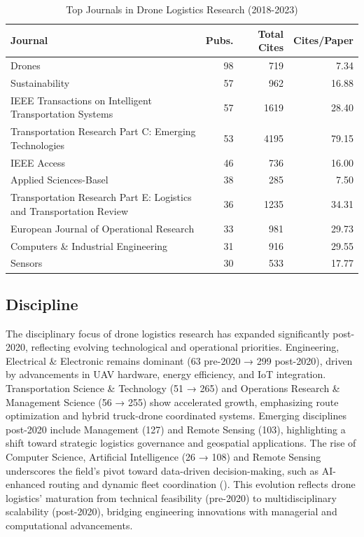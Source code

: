 \documentclass{article}
\begin{document}
\begin{table}[htbp]
  \centering
  \caption{Top Journals in Drone Logistics Research (2018-2023)}
  \label{tab:journals}
  \begin{tabularx}{0.9\textwidth}{@{} >{\raggedright}X r r r @{}}
    \toprule
    \textbf{Journal} & \textbf{Pubs.} & \textbf{Total Cites} & \textbf{Cites/Paper} \\
    \midrule
    Drones & 98 & 719 & 7.34 \\
    Sustainability & 57 & 962 & 16.88 \\
    IEEE Transactions on Intelligent Transportation Systems & 57 & 1619 & 28.40 \\
    Transportation Research Part C: Emerging Technologies & 53 & 4195 & 79.15 \\
    IEEE Access & 46 & 736 & 16.00 \\
    Applied Sciences-Basel & 38 & 285 & 7.50 \\
    Transportation Research Part E: Logistics and Transportation Review & 36 & 1235 & 34.31 \\
    European Journal of Operational Research & 33 & 981 & 29.73 \\
    Computers \& Industrial Engineering & 31 & 916 & 29.55 \\
    Sensors & 30 & 533 & 17.77 \\
    \bottomrule
  \end{tabularx}
  
  \vspace{0.5em}
  \raggedright\footnotesize
\end{table}

\FloatBarrier

\subsection{Discipline}
The disciplinary focus of drone logistics research has expanded significantly post-2020, reflecting evolving technological and operational priorities. Engineering, Electrical \& Electronic remains dominant (63 pre-2020 → 299 post-2020), driven by advancements in UAV hardware, energy efficiency, and IoT integration. Transportation Science \& Technology (51 → 265) and Operations Research \& Management Science (56 → 255) show accelerated growth, emphasizing route optimization and hybrid truck-drone coordinated systems. Emerging disciplines post-2020 include Management (127) and Remote Sensing (103), highlighting a shift toward strategic logistics governance and geospatial applications. The rise of Computer Science, Artificial Intelligence (26 → 108) and Remote Sensing underscores the field’s pivot toward data-driven decision-making, such as AI-enhanced routing and dynamic fleet coordination (\cite{WOS:000742554100008}). This evolution reflects drone logistics' maturation from technical feasibility (pre-2020) to multidisciplinary scalability (post-2020), bridging engineering innovations with managerial and computational advancements.
\end{document}
